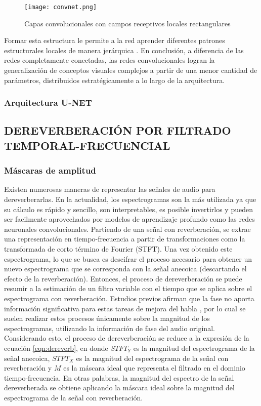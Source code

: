 \begin{figure}[H]
  \centering{}
  \texttt{[image: convnet.png]}
  \caption{Capas convolucionales con campos receptivos locales rectangulares}
  \label{fig:convnet}
\end{figure}

Formar esta estructura le permite a la red aprender diferentes patrones estructurales locales de manera jerárquica \cite{lagartija}. En conclusión, a diferencia de las redes completamente conectadas, las redes convolucionales logran la generalización de conceptos visuales complejos a partir de una menor cantidad de parámetros, distribuidos estratégicamente a lo largo de la arquitectura.  

\subsubsection{Arquitectura U-NET}


\subsection[Dereverberación por filtrado temporal-frecuencial]{DEREVERBERACIÓN POR FILTRADO TEMPORAL-FRECUENCIAL}

\subsubsection{Máscaras de amplitud}

Existen numerosas maneras de representar las señales de audio para dereverberarlas. En la actualidad, los espectrogramas son la más utilizada ya que su cálculo es rápido y sencillo, son interpretables, es posible invertirlos y pueden ser facilmente aprovechados por modelos de aprendizaje profundo como las redes neuronales convolucionales. Partiendo de una señal con reverberación, se extrae una representación en tiempo-frecuencia a partir de transformaciones como la transformada de corto término de Fourier (STFT). Una vez obtenido este espectrograma, lo que se busca es descifrar el proceso necesario para obtener un nuevo espectrograma que se corresponda con la señal anecoica (descartando el efecto de la reverberación). Entonces, el proceso de dereverberación se puede resumir a la estimación de un filtro variable con el tiempo que se aplica sobre el espectrograma con reverberación. Estudios previos afirman que la fase no aporta información significativa para estas tareas de mejora del habla \cite{fase1}\cite{fase2}, por lo cual se suelen realizar estos procesos únicamente sobre la magnitud de los espectrogramas, utilizando la información de fase del audio original. Considerando esto, el proceso de dereverberación se reduce a la expresión de la ecuación \ref{eqn:dereverb}, en donde $STFT_{Y}$ es la magnitud del espectrograma de la señal anecoica, $STFT_{X}$ es la magnitud del espectrograma de la señal con reverberación y $M$ es la máscara ideal que representa el filtrado en el dominio tiempo-frecuencia. En otras palabras, la magnitud del espectro de la señal dereverberada se obtiene aplicando la máscara ideal sobre la magnitud del espectrograma de la señal con reverberación. 
 
